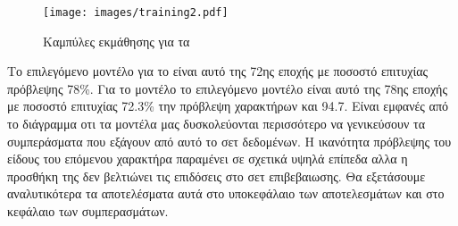 \begin{figure}[h]
	\texttt{[image: images/training2.pdf]}
	\centering
	\caption{Καμπύλες εκμάθησης για τα }
	\label{training1}
\end{figure}


Το επιλεγόμενο μοντέλο για το  είναι αυτό της 72ης εποχής με ποσοστό επιτυχίας πρόβλεψης 78\%. Για το μοντέλο  το επιλεγόμενο μοντέλο είναι αυτό της 78ης εποχής με ποσοστό επιτυχίας 72.3\% την πρόβλεψη χαρακτήρων και 94.7. Είναι εμφανές από το διάγραμμα οτι τα μοντέλα μας δυσκολεύονται περισσότερο να γενικεύσουν τα συμπεράσματα που εξάγουν από αυτό το σετ δεδομένων. Η ικανότητα πρόβλεψης του είδους του επόμενου χαρακτήρα παραμένει σε σχετικά υψηλά επίπεδα αλλα η προσθήκη της δεν βελτιώνει τις επιδόσεις στο σετ επιβεβαιωσης. Θα εξετάσουμε αναλυτικότερα τα αποτελέσματα αυτά στο υποκεφάλαιο των αποτελεσμάτων και στο κεφάλαιο των συμπερασμάτων.

